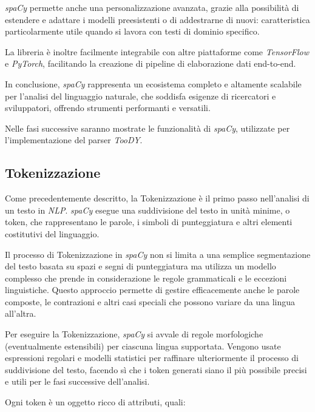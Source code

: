 \documentclass[12pt]{report}
\newcommand{\toody}{\textsl{TooDY}\xspace}
\newcommand{\spacy}{\textsl{spaCy}\xspace}
\newcommand{\nlp}{\textsl{NLP}\xspace}
\begin{document}
\spacy permette anche una personalizzazione avanzata, grazie alla possibilità di estendere e adattare i modelli preesistenti o di addestrarne di nuovi: caratteristica particolarmente utile quando si lavora con testi di dominio specifico.

La libreria è inoltre facilmente integrabile con altre piattaforme come \textsl{TensorFlow} e \textsl{PyTorch}, facilitando la creazione di pipeline di elaborazione dati end-to-end.

In conclusione, \spacy rappresenta un ecosistema completo e altamente scalabile per l'analisi del linguaggio naturale, che soddisfa esigenze di ricercatori e sviluppatori, offrendo strumenti performanti e versatili.

Nelle fasi successive saranno mostrate le funzionalità di \spacy, utilizzate per l'implementazione del parser \toody.


\subsection{Tokenizzazione}
Come precedentemente descritto, la \textsf{Tokenizzazione} è il primo passo nell'analisi di un testo in \nlp. \spacy esegue una suddivisione del testo in unità minime, o token, che rappresentano le parole, i simboli di punteggiatura e altri elementi costitutivi del linguaggio.

Il processo di Tokenizzazione in \spacy non si limita a una semplice segmentazione del testo basata su spazi e segni di punteggiatura ma utilizza un modello complesso che prende in considerazione le regole grammaticali e le eccezioni linguistiche. Questo approccio permette di gestire efficacemente anche le parole composte, le contrazioni e altri casi speciali che possono variare da una lingua all'altra.

Per eseguire la Tokenizzazione, \spacy si avvale di regole morfologiche (eventualmente estensibili) per ciascuna lingua supportata. Vengono usate espressioni regolari e modelli statistici per raffinare ulteriormente il processo di suddivisione del testo, facendo sì che i token generati siano il più possibile precisi e utili per le fasi successive dell'analisi.

Ogni token è un oggetto ricco di attributi, quali:
\end{document}
